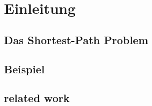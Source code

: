 \section{Einleitung}
\subsection{Das Shortest-Path Problem}
\subsection{Beispiel}
\subsection{related work}